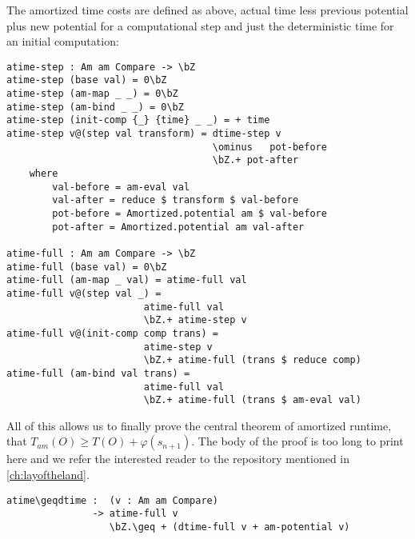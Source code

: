 The amortized time costs are defined as above, actual time less previous potential plus new potential for a computational step and just the deterministic time for an initial computation:
\begin{lstlisting}[caption={Amortized time},label={lst:amortized:framework:amortizedtime},emph={dtime,atime,step,full}]
atime-step : Am am Compare -> \bZ
atime-step (base val) = 0\bZ
atime-step (am-map _ _) = 0\bZ
atime-step (am-bind _ _) = 0\bZ
atime-step (init-comp {_} {time} _ _) = + time
atime-step v@(step val transform) = dtime-step v
                                    \ominus   pot-before
                                    \bZ.+ pot-after
    where
        val-before = am-eval val
        val-after = reduce $ transform $ val-before
        pot-before = Amortized.potential am $ val-before
        pot-after = Amortized.potential am val-after

atime-full : Am am Compare -> \bZ
atime-full (base val) = 0\bZ
atime-full (am-map _ val) = atime-full val
atime-full v@(step val _) =
                        atime-full val
                        \bZ.+ atime-step v
atime-full v@(init-comp comp trans) =
                        atime-step v
                        \bZ.+ atime-full (trans $ reduce comp)
atime-full (am-bind val trans) =
                        atime-full val
                        \bZ.+ atime-full (trans $ am-eval val)
\end{lstlisting}

All of this allows us to finally prove the central theorem of amortized runtime, that $T_{am}(O) \geq T(O) + \varphi(s_{n+1})$. The body of the proof is too long to print here and we refer the interested reader to the repository mentioned in \autoref{ch:layoftheland}.

\begin{lstlisting}[caption={Theorem: Amortized time is an upper bound on actual time},emph={atime,dtime,pot,full,potential}]
atime\geqdtime :  (v : Am am Compare)
               -> atime-full v
                  \bZ.\geq + (dtime-full v + am-potential v)
\end{lstlisting}